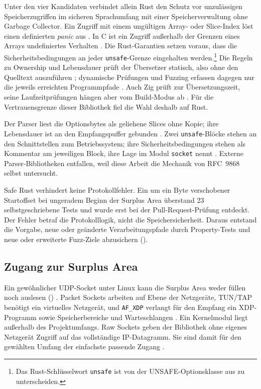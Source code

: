 Unter den vier Kandidaten verbindet allein Rust den Schutz vor unzulässigen Speicherzugriffen im sicheren
Sprachumfang mit einer Speicherverwaltung ohne Garbage Collector. Ein Zugriff mit einem ungültigen Array-
oder Slice-Index löst einen
definierten \textit{panic} aus \cite{rust-lang,rust-book}. In C ist ein Zugriff außerhalb der Grenzen
eines Arrays undefiniertes Verhalten \cite{iso-c}. Die Rust-Garantien setzen voraus, dass die
Sicherheitsbedingungen an jeder \texttt{unsafe}-Grenze eingehalten werden.\footnote{Das Rust-Schlüsselwort
\texttt{unsafe} ist von der
UNSAFE-Optionsklasse aus  zu unterscheiden.}
Die Regeln zu Ownership und Lebensdauer prüft der Übersetzer statisch, also ohne den Quelltext
auszuführen \cite{rust-book}; dynamische Prüfungen und Fuzzing erfassen dagegen nur die jeweils
erreichten Programmpfade \cite{nsa-memory-safety}. Auch Zig prüft zur Übersetzungszeit, seine
Laufzeitprüfungen hängen aber vom Build-Modus ab \cite{zig-lang}. Für die Vertrauensgrenze dieser
Bibliothek fiel die Wahl deshalb auf Rust.

Der Parser liest die Optionsbytes als geliehene Slices ohne Kopie; ihre Lebensdauer ist an den
Empfangspuffer gebunden \cite{rust-book}. Zwei
\texttt{unsafe}-Blöcke stehen an den Schnittstellen zum Betriebssystem; ihre Sicherheits\-bedingungen
stehen als Kommentar am jeweiligen Block, ihre Lage im Modul \texttt{socket} nennt .
Externe Parser-Bibliotheken entfallen, weil diese Arbeit die Mechanik von RFC~9868 selbst untersucht.

Safe Rust verhindert keine Protokollfehler. Ein um ein Byte verschobener Start\-offset bei ungeradem
Beginn der Surplus Area überstand 23 selbstgeschriebene Tests und wurde erst bei der
Pull-Request-Prüfung entdeckt. Der Fehler betraf die Protokolllogik, nicht die Speichersicherheit.
Daraus entstand die Vorgabe, neue oder geänderte Verarbeitungspfade durch Property-Tests und neue oder
erweiterte Fuzz-Ziele abzusichern ().

\subsection{Zugang zur Surplus Area}
\label{subsec:surplus-zugang}

Ein gewöhnlicher UDP-Socket unter Linux kann die Surplus Area weder füllen noch auslesen
() \cite{linux510udp}. Packet Sockets arbeiten auf Ebene der Netzgeräte,
TUN/TAP benötigt ein virtuelles Netzgerät, und \texttt{AF\_XDP} verlangt für den Empfang ein XDP-Programm
sowie Speicherbereiche und Warteschlangen \cite{man7packet,linux510tuntap,linux510afxdp}.
Ein Kernel\-modul liegt außerhalb des Projektumfangs. Raw Sockets geben der Bibliothek ohne eigenes
Netzgerät Zugriff auf das vollständige IP-Datagramm. Sie sind damit für den gewählten Umfang der
einfachste passende Zugang \cite{man7raw}.

